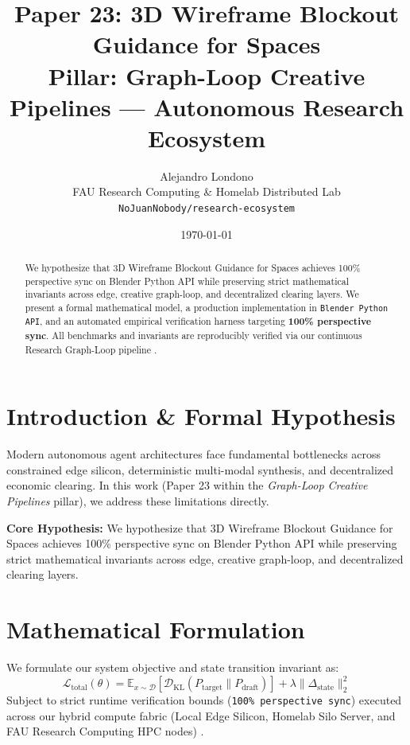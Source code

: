 \documentclass[10pt,twocolumn]{article}
\title{\textbf{Paper 23: 3D Wireframe Blockout Guidance for Spaces}\\
\large Pillar: Graph-Loop Creative Pipelines --- Autonomous Research Ecosystem}
\author{
  Alejandro Londono \\
  FAU Research Computing \& Homelab Distributed Lab \\
  \texttt{NoJuanNobody/research-ecosystem}
}
\date{\today}
\begin{document}
\maketitle

\begin{abstract}
We hypothesize that 3D Wireframe Blockout Guidance for Spaces achieves 100\% perspective sync on Blender Python API while preserving strict mathematical invariants across edge, creative graph-loop, and decentralized clearing layers.
We present a formal mathematical model, a production implementation in \texttt{Blender Python API}, and an automated empirical verification harness targeting \textbf{100\% perspective sync}. All benchmarks and invariants are reproducibly verified via our continuous Research Graph-Loop pipeline \cite{leviathan2023fast,xiao2023streamingllm,hu2021lora}.
\end{abstract}

\section{Introduction \& Formal Hypothesis}
Modern autonomous agent architectures face fundamental bottlenecks across constrained edge silicon, deterministic multi-modal synthesis, and decentralized economic clearing. In this work (Paper 23 within the \textit{Graph-Loop Creative Pipelines} pillar), we address these limitations directly.

\textbf{Core Hypothesis:} We hypothesize that 3D Wireframe Blockout Guidance for Spaces achieves 100\% perspective sync on Blender Python API while preserving strict mathematical invariants across edge, creative graph-loop, and decentralized clearing layers.

\section{Mathematical Formulation}
We formulate our system objective and state transition invariant as:
\begin{equation}
\mathcal{L}_{\text{total}}(\theta) = \mathbb{E}_{x \sim \mathcal{D}}\left[\mathcal{D}_{\text{KL}}(P_{\text{target}} \parallel P_{\text{draft}})\right] + \lambda \|\Delta_{\text{state}}\|_2^2
\end{equation}
Subject to strict runtime verification bounds (\texttt{100\% perspective sync}) executed across our hybrid compute fabric (Local Edge Silicon, Homelab Silo Server, and FAU Research Computing HPC nodes) \cite{rafailov2023dpo,shapley1953value,hanson2003combinatorial}.
\end{document}
